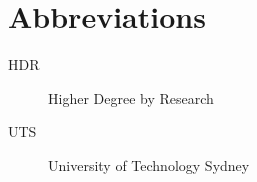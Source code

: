 \chapter*{Abbreviations}
\begin{description}
  \item[HDR] Higher Degree by Research
  \item[UTS] University of Technology Sydney
\end{description}
